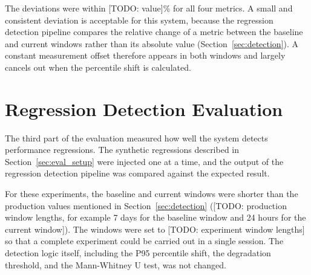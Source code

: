 
The deviations were within [TODO: value]\% for all four metrics. %
A small and consistent deviation is acceptable for this system, because the regression detection pipeline compares the relative change of a metric between the baseline and current windows rather than its absolute value (Section~\ref{sec:detection}). A constant measurement offset therefore appears in both windows and largely cancels out when the percentile shift is calculated.

\section{Regression Detection Evaluation}
\label{sec:eval_regression}

The third part of the evaluation measured how well the system detects performance regressions. The synthetic regressions described in Section~\ref{sec:eval_setup} were injected one at a time, and the output of the regression detection pipeline was compared against the expected result.

For these experiments, the baseline and current windows were shorter than the production values mentioned in Section~\ref{sec:detection} ([TODO: production window lengths, for example 7 days for the baseline window and 24 hours for the current window]). The windows were set to [TODO: experiment window lengths] so that a complete experiment could be carried out in a single session. The detection logic itself, including the P95 percentile shift, the degradation threshold, and the Mann-Whitney U test, was not changed.

